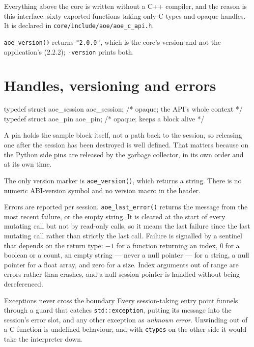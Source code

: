 \documentclass[11pt,a4paper,oneside]{report}
\newcommand{\appver}{2.2.2}
\newcommand{\code}[1]{\texttt{#1}}
\begin{document}
Everything above the core is written without a C++ compiler, and the reason is
this interface: sixty exported functions taking only C types and opaque handles.
It is declared in \code{core/include/aoe/aoe\_c\_api.h}.

\code{aoe\_version()} returns \code{"2.0.0"}, which is the core's version and
not the application's (\appver); \code{-version} prints both.

\section{Handles, versioning and errors}

\begin{aoecode}
typedef struct aoe_session aoe_session;   /* opaque; the API's whole context */
typedef struct aoe_pin     aoe_pin;       /* opaque; keeps a block alive */
\end{aoecode}

A pin holds the sample block itself, not a path back to the session, so
releasing one after the session has been destroyed is well defined. That matters
because on the Python side pins are released by the garbage collector, in its
own order and at its own time.

The only version marker is \code{aoe\_version()}, which returns a string. There
is no numeric ABI-version symbol and no version macro in the header.

Errors are reported per session. \code{aoe\_last\_error()} returns the message
from the most recent failure, or the empty string. It is cleared at the start of
every mutating call but not by read-only calls, so it means the last failure
since the last mutating call rather than strictly the last call. Failure is
signalled by a sentinel that depends on the return type: $-1$ for a function
returning an index, 0 for a boolean or a count, an empty string --- never a null
pointer --- for a string, a null pointer for a float array, and zero for a size.
Index arguments out of range are errors rather than crashes, and a null session
pointer is handled without being dereferenced.

\begin{aoenote}{Exceptions never cross the boundary}
Every session-taking entry point funnels through a guard that catches
\code{std::exception}, putting its message into the session's error slot, and
any other exception as \emph{unknown error}. Unwinding out of a C function is
undefined behaviour, and with \code{ctypes} on the other side it would take the
interpreter down.
\end{aoenote}
\end{document}
